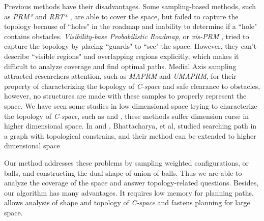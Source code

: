 \documentclass[11pt]{article}
\begin{document}
\indent Previous methods have their disadvantages. Some sampling-based methods, such as \emph{PRM*} and \emph{RRT*} \cite{prmstar}, are able to cover the space, but failed to capture the topology \cite{sampissues} because of ``holes" in the roadmap and inability to determine if a ``hole" contains obstacles. \emph{Visibility-base Probabilistic Roadmap}, or \emph{vis-PRM} \cite{vprm}, tried to capture the topology by placing ``guards" to ``see" the space. However, they can't describe ``visible regions" and overlapping regions explicitly, which makes it difficult to analyze coverage and find optimal paths. Medial Axis sampling attracted researchers attention, such as \emph{MAPRM}\cite{MAPRM} and \emph{UMAPRM}\cite{UMAPRM}, for their property of characterizing the topology of \emph{C-space} and safe clearance to obstacles, however, no structures are made with these samples to properly represent the space. We have seen some studies in low dimensional space trying to characterize the topology of \emph{C-space}, such as \cite{ConCompNum} and \cite{interval}, these methods suffer dimension curse in higher dimensional space. In \cite{pathtopsearch} and \cite{pathtop}, Bhattacharya, et al, studied searching path in a graph with topological constrains, and their method can be extended to higher dimensional space


\indent Our method addresses these problems by sampling weighted configurations, or balls, and constructing the dual shape of union of balls. Thus we are able to analyze the coverage of the space and answer topology-related questions. Besides, our algorithm has many advantages. It requires low memory for planning paths, allows analysis of shape and topology of \emph{C-space} and fastens planning for large space.
\end{document}
